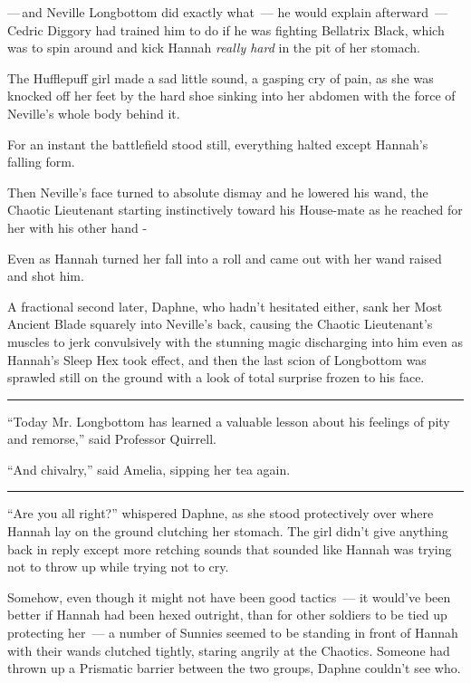 ---\,and Neville Longbottom did exactly what~--- he would explain afterward~--- Cedric Diggory had trained him to do if he was fighting Bellatrix Black, which was to spin around and kick Hannah \emph{really hard} in the pit of her stomach.

The Hufflepuff girl made a sad little sound, a gasping cry of pain, as she was knocked off her feet by the hard shoe sinking into her abdomen with the force of Neville's whole body behind it.

For an instant the battlefield stood still, everything halted except Hannah's falling form.

Then Neville's face turned to absolute dismay and he lowered his wand, the Chaotic Lieutenant starting instinctively toward his House-mate as he reached for her with his other hand -

Even as Hannah turned her fall into a roll and came out with her wand raised and shot him.

A fractional second later, Daphne, who hadn't hesitated either, sank her Most Ancient Blade squarely into Neville's back, causing the Chaotic Lieutenant's muscles to jerk convulsively with the stunning magic discharging into him even as Hannah's Sleep Hex took effect, and then the last scion of Longbottom was sprawled still on the ground with a look of total surprise frozen to his face.

\begin{center}\rule{3in}{0.4pt}\end{center}

``Today Mr. Longbottom has learned a valuable lesson about his feelings of pity and remorse,'' said Professor Quirrell.

``And chivalry,'' said Amelia, sipping her tea again.

\begin{center}\rule{3in}{0.4pt}\end{center}

``Are you all right?'' whispered Daphne, as she stood protectively over where Hannah lay on the ground clutching her stomach. The girl didn't give anything back in reply except more retching sounds that sounded like Hannah was trying not to throw up while trying not to cry.

Somehow, even though it might not have been good tactics~--- it would've been better if Hannah had been hexed outright, than for other soldiers to be tied up protecting her~--- a number of Sunnies seemed to be standing in front of Hannah with their wands clutched tightly, staring angrily at the Chaotics. Someone had thrown up a Prismatic barrier between the two groups, Daphne couldn't see who.


